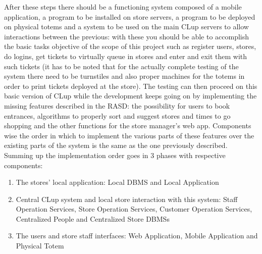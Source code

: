 After these steps there should be a functioning system composed of a mobile application, a program to be installed on store servers, a program to be deployed on physical totems and a system to be used on the main CLup servers to allow interactions between the previous: with these you should be able to accomplish the basic tasks objective of the scope of this project such as register users, stores, do logins, get tickets to virtually queue in stores and enter and exit them with such tickets (it has to be noted that for the actually complete testing of the system there need to be turnstiles and also proper machines for the totems in order to print tickets deployed at the store). The testing can then proceed on this basic version of CLup while the development keeps going on by implementing the missing features described in the RASD: the possibility for users to book entrances, algorithms to properly sort and suggest stores and times to go shopping and the other functions for the store manager’s web app.
Components wise the order in which to implement the various parts of these features over the existing parts of the system is the same as the one previously described.
Summing up the implementation order goes in 3 phases with respective components: \begin{enumerate}
	\item The stores’ local application: Local DBMS and Local Application
	\item Central CLup system and local store interaction with this system: Staff Operation Services, Store Operation Services, Customer Operation Services, Centralized People and Centralized Store DBMSs
	\item The users and store staff interfaces: Web Application, Mobile Application and Physical Totem
\end{enumerate}




